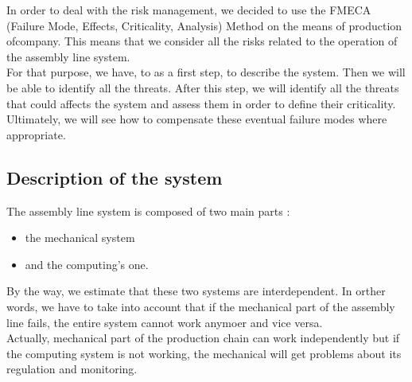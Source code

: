 In order to deal with the risk management, we decided to use the FMECA (Failure Mode, Effects, Criticality, Analysis) Method on the means of production of\moldco company. This means that we consider all the risks related to the operation of the assembly line system.\\

For that purpose, we have, to as a first step, to describe the system. Then we will be able to identify all the threats. After this step, we will identify all the threats that could affects the system and assess them in order to define their criticality.\\
Ultimately, we will see how to compensate these eventual failure modes where appropriate.\\

\subsection{Description of the system}

The assembly line system is composed of two main parts : 
\begin{itemize}
    \item the mechanical system
    \item and the computing's one.\\
\end{itemize}

By the way, we estimate that these two systems are interdependent. In orther words, we have to take into account that if the mechanical part of the assembly line fails, the entire system cannot work anymoer and vice versa.\\
Actually, mechanical part of the production chain can work independently but if the computing system is not working, the mechanical will get problems about its regulation and monitoring.\\

